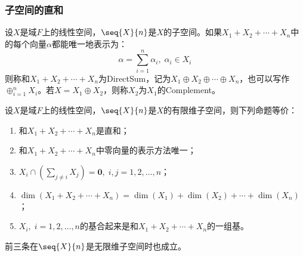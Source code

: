 \subsubsection{子空间的直和}
\begin{definition}
	设$X$是域$F$上的线性空间，$\seq{X}{n}$是$X$的子空间。如果$X_1+X_2+\cdots+X_n$中的每个向量$\alpha$都能唯一地表示为：
	\begin{equation*}
		\alpha=\sum_{i=1}^{n}\alpha_i,\;\alpha_i\in X_i
	\end{equation*}
	则称和$X_1+X_2+\cdots+X_n$为\gls{DirectSum}，记为$X_1\oplus X_2\oplus\cdots\oplus X_n$，也可以写作$\oplus_{i=1}^nX_i$。若$X=X_1\oplus X_2$，则称$X_2$为$X_1$的\gls{Complement}。
\end{definition}
\begin{theorem}\label{theo:DirectSum}
	设$X$是域$F$上的线性空间，$\seq{X}{n}$是$X$的有限维子空间，则下列命题等价：
	\begin{enumerate}
		\item 和$X_1+X_2+\cdots+X_n$是直和；
		\item 和$X_1+X_2+\cdots+X_n$中零向量的表示方法唯一；
		\item $X_i\cap\left(\sum\limits_{j\ne i}X_j\right)=\mathbf{0},\;i,j=1,2,\dots,n$；
		\item $\dim(X_1+X_2+\cdots+X_n)=\dim(X_1)+\dim(X_2)+\cdots+\dim(X_n)$；
		\item $X_i,\;i=1,2,\dots,n$的基合起来是和$X_1+X_2+\cdots+X_n$的一组基。
	\end{enumerate}
	前三条在$\seq{X}{n}$是无限维子空间时也成立。
\end{theorem}

